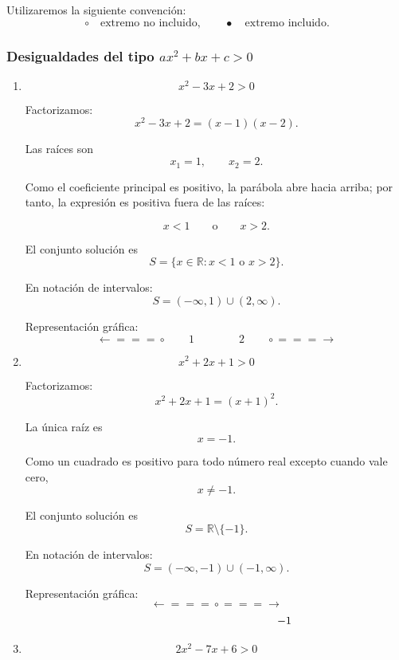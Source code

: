 \documentclass[12pt]{article}
\theoremstyle{plain}
\theoremstyle{definition}
\theoremstyle{remark}
\begin{document}
{Utilizaremos la siguiente convención:
\[
\circ \quad \text{extremo no incluido},
\qquad
\bullet \quad \text{extremo incluido}.
\]

\subsubsection*{Desigualdades del tipo \(ax^2+bx+c>0\)}
\begin{enumerate}

\item
\[
x^2-3x+2>0
\]

Factorizamos:
\[
x^2-3x+2=(x-1)(x-2).
\]

Las raíces son
\[
x_1=1,
\qquad
x_2=2.
\]

Como el coeficiente principal es positivo, la parábola abre hacia arriba;
por tanto, la expresión es positiva fuera de las raíces:

\[
x<1
\qquad \text{o} \qquad
x>2.
\]

El conjunto solución es
\[
\boxed{
S=\{x\in\mathbb{R}:x<1\text{ o }x>2\}.
}
\]

En notación de intervalos:
\[
\boxed{
S=(-\infty,1)\cup(2,\infty).
}
\]

Representación gráfica:
\[
\longleftarrow\!\!=\!\!=\!\!=\!\circ
\qquad 1
\qquad\qquad
2\qquad
\circ\!\!=\!\!=\!\!=\!\longrightarrow
\]

\item
\[
x^2+2x+1>0
\]

Factorizamos:
\[
x^2+2x+1=(x+1)^2.
\]

La única raíz es
\[
x=-1.
\]

Como un cuadrado es positivo para todo número real excepto cuando vale
cero,
\[
x\neq -1.
\]

El conjunto solución es
\[
\boxed{
S=\mathbb{R}\setminus\{-1\}.
}
\]

En notación de intervalos:
\[
\boxed{
S=(-\infty,-1)\cup(-1,\infty).
}
\]

Representación gráfica:
\[
\longleftarrow\!\!=\!\!=\!\!=\!\circ\!\!=\!\!=\!\!=\!\longrightarrow
\]
\[
\hspace{4.3cm}-1
\]

\item
\[
2x^2-7x+6>0
\]


\end{enumerate}}
\end{document}
